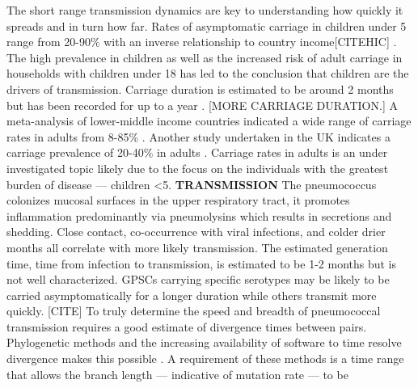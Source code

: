 \documentclass{article}
\begin{document}
The short range transmission dynamics are key to understanding how quickly it spreads and in turn how far. Rates of asymptomatic carriage in children under 5 range from 20-90\% with an inverse relationship to country income[CITEHIC] \cite{adegbolaCarriageStreptococcusPneumoniae2014}.  The high prevalence in children as well as the increased risk of adult carriage in households with children under 18 has led to the conclusion that children are the drivers of transmission\cite{almeidaDynamicsPneumococcalCarriage2020}. Carriage duration is estimated to be around 2 months but has been recorded for up to a year \cite{almeidaDynamicsPneumococcalCarriage2020,dubeLongitudinalCharacterizationNasopharyngeal2018}. [MORE CARRIAGE DURATION.] A meta-analysis of lower-middle income countries indicated a wide range of carriage rates in adults from 8-85\% \cite{adegbolaCarriageStreptococcusPneumoniae2014}. Another study undertaken in the UK indicates a carriage prevalence of 20-40\% in adults\cite{almeidaDynamicsPneumococcalCarriage2020} . Carriage rates in adults is an under investigated topic likely due to the focus on the individuals with the greatest burden of disease --- children <5. 
\textbf{TRANSMISSION } The pneumococcus colonizes mucosal surfaces in the upper respiratory tract, it promotes inflammation predominantly via pneumolysins which results in secretions and shedding. Close contact, co-occurrence with viral infections, and colder drier months all correlate with more likely transmission. The estimated generation time, time from infection to transmission, is estimated to be 1-2 months but is not well characterized. GPSCs carrying specific serotypes may be likely to be carried asymptomatically for a longer duration while others transmit more quickly. [CITE]
To truly determine the speed and breadth of pneumococcal transmission requires a good estimate of divergence times between pairs. Phylogenetic methods and the increasing availability of software to time resolve divergence makes this possible \cite{didelotBayesianInferenceAncestral2018,drummondBayesianEvolutionaryAnalysis2015}. A requirement of these methods is a time range that allows the branch length --- indicative of mutation rate --- to be 
\end{document}
